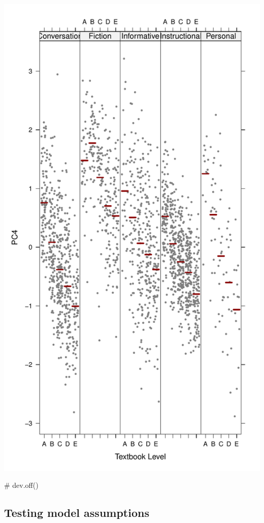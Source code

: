 \documentclass[
  letterpaper,
  DIV=11,
  numbers=noendperiod]{scrreprt}
\newenvironment{Shaded}{\begin{snugshade}}{\end{snugshade}}
\newcommand{\CommentTok}[1]{\textcolor[rgb]{0.37,0.37,0.37}{#1}}
\begin{document}
\includegraphics{E_Ch6_Analysis_files/figure-pdf/unnamed-chunk-32-1.pdf}

\begin{Shaded}
\begin{Highlighting}[]
\CommentTok{\# dev.off()}
\end{Highlighting}
\end{Shaded}

\subsection{Testing model assumptions}\label{testing-model-assumptions}
\end{document}
